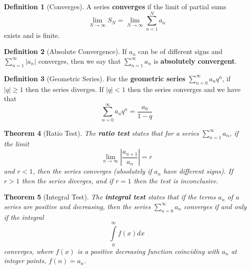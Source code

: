 \documentclass[12pt]{article}
\newtheorem{thm}{Theorem}[section]
\theoremstyle{definition}
\newtheorem{defn}[thm]{Definition}
\theoremstyle{remark}
\numberwithin{equation}{section}
\newcommand\B[1]{\textbf{ #1}}
\begin{document}
\vspace{1cm}


\begin{defn}[Converges]
        A series \B{converges} if the limit of partial sums \begin{equation}
                \lim\limits_{N\rightarrow \infty}S_N = \lim\limits_{N\rightarrow \infty}\sum\limits_{n=1}^Na_n
        \end{equation}
        exists and is finite.
\end{defn}


\vspace{1cm}


\begin{defn}[Absolute Convergence]
        If $a_n$ can be of different signs and $\sum\limits_{n=1}^{\infty}|a_n|$ converges, then we say that $\sum\limits_{n=1}^{\infty}a_n$ is \B{absolutely convergent}.
\end{defn}


\vspace{1cm}

\begin{defn}[Geometric Series]
        For the \B{geometric series} $\sum\limits_{n=0}^{\infty}a_nq^n$, if $|q| \geq 1$ then the series diverges. If $|q| < 1$ then  the series converges and we have that \begin{equation}
                \sum\limits_{n=0}^{\infty}a_nq^n = \frac{a_0}{1-q}
        \end{equation}
\end{defn}


\vspace{1cm}



\begin{thm}[Ratio Test]
        The \B{ratio test} states that for a series $\sum\limits_{n=1}^{\infty}a_n$, if the limit \begin{equation}
                \lim\limits_{n\rightarrow \infty}\left|\frac{a_{n+1}}{a_n}\right| = r
        \end{equation}
        and $r < 1$, then the series converges (absolutely if $a_n$ have different signs). If $r > 1$ then the series diverges, and if $r=1$ then the test is inconclusive.
\end{thm}


\vspace{1cm}


\begin{thm}[Integral Test]
        The \B{integral test} states that if the terms $a_n$ of a series are positive and decreasing, then the series $\sum\limits_{n=0}^{\infty}a_n$ converges if and only if the integral \begin{equation}
                \int\limits_{0}^{\infty}f(x)dx
        \end{equation}
        converges, where $f(x)$ is a positive decreasing function coinciding with $a_n$ at integer points, $f(n) = a_n$.
\end{thm}
\end{document}
